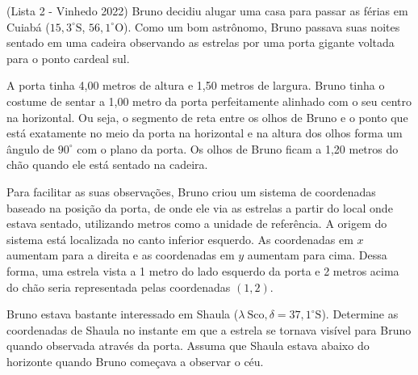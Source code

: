 \documentclass[11pt]{article}
\begin{document}
\begin{pproblem}(Lista 2 - Vinhedo 2022) 
    Bruno decidiu alugar uma casa para passar as férias em Cuiabá ($15,3^{\circ} \text{S}$, $56,1^{\circ} \text{O}$). Como um bom astrônomo, Bruno passava suas noites sentado em uma cadeira observando as estrelas por uma porta gigante voltada para o ponto cardeal sul.

    A porta tinha 4,00 metros de altura e 1,50 metros de largura. Bruno tinha o costume de sentar a
    1,00 metro da porta perfeitamente alinhado com o seu centro na horizontal. Ou seja, o segmento
    de reta entre os olhos de Bruno e o ponto que está exatamente no meio da porta na horizontal e
    na altura dos olhos forma um ângulo de $90^{\circ}$ com o plano da porta. Os olhos de Bruno ficam a
    1,20 metros do chão quando ele está sentado na cadeira.
    
    Para facilitar as suas observações, Bruno criou um sistema de coordenadas baseado na posição da
    porta, de onde ele via as estrelas a partir do local onde estava sentado, utilizando metros como
    a unidade de referência. A origem do sistema está localizada no canto inferior esquerdo. As coordenadas
    em $x$ aumentam para a direita e as coordenadas em $y$ aumentam para cima. Dessa forma, uma
    estrela vista a 1 metro do lado esquerdo da porta e 2 metros acima do chão seria representada
    pelas coordenadas $(1, 2)$.
    
    Bruno estava bastante interessado em Shaula ($\lambda \ \text{Sco}, \delta = 37,1^{\circ} \text{S}$). Determine as coordenadas de
    Shaula no instante em que a estrela se tornava visível para Bruno quando observada através da porta. Assuma que Shaula estava abaixo do horizonte quando Bruno começava a observar o céu.
\end{pproblem}
\end{document}
